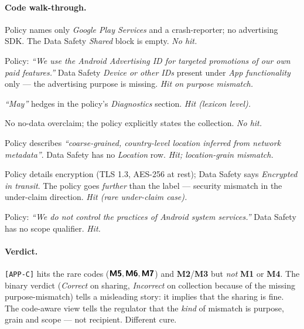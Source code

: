 \documentclass[11pt,a4paper]{article}
\newcommand{\code}[1]{\textsf{\textbf{#1}}}
\begin{document}
\paragraph{Code walk-through.}
\begin{description}[topsep=2pt,itemsep=2pt,leftmargin=1.6em]
\item[\code{M1}] Policy names only \emph{Google Play Services} and a
crash-reporter; no advertising SDK. The Data Safety \textsl{Shared}
block is empty. \emph{No hit.}
\item[\code{M2}] Policy: \emph{``We use the Android Advertising ID
for targeted promotions of our own paid features.''} Data Safety
\textsl{Device or other IDs} present under \textsl{App functionality}
only --- the advertising purpose is missing. \emph{Hit on purpose
mismatch.}
\item[\code{M3}] \emph{``May''} hedges in the policy's
\emph{Diagnostics} section. \emph{Hit (lexicon level).}
\item[\code{M4}] No no-data overclaim; the policy explicitly states
the collection. \emph{No hit.}
\item[\code{M5}] Policy describes \emph{``coarse-grained, country-level
location inferred from network metadata''}. Data Safety has no
\textsl{Location} row. \emph{Hit; location-grain mismatch.}
\item[\code{M6}] Policy details encryption (TLS 1.3, AES-256 at rest);
Data Safety says \textsl{Encrypted in transit}. The policy goes
\emph{further} than the label --- security mismatch in the under-claim
direction. \emph{Hit (rare under-claim case).}
\item[\code{M7}] Policy: \emph{``We do not control the practices of
Android system services.''} Data Safety has no scope qualifier.
\emph{Hit.}
\end{description}

\paragraph{Verdict.} \texttt{[APP-C]} hits the rare codes ($\code{M5},
\code{M6}, \code{M7}$) and \code{M2}/\code{M3} but \emph{not} \code{M1}
or \code{M4}. The binary verdict (\emph{Correct} on sharing,
\emph{Incorrect} on collection because of the missing
purpose-mismatch) tells a misleading story: it implies that the
sharing is fine. The code-aware view tells the regulator that the
\emph{kind} of mismatch is purpose, grain and scope --- not
recipient. Different cure.
\end{document}

